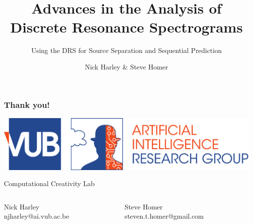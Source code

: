 \documentclass{beamer}
\begin{document}
\title{Advances in the Analysis of \\ Discrete Resonance Spectrograms}
\subtitle{Using the DRS for Source Separation and Sequential Prediction}
\author{Nick Harley \& Steve Homer}
\date{}
\frame{\titlepage}

%



\begin{frame}
  \frametitle{Thank you!}
  \includegraphics[width=\textwidth]{dept/vub-ai.pdf}
  \begin{center}
    \huge{Computational Creativity Lab}
    
    \begin{columns}
    	\begin{column}{0.5\textwidth}
    		\centering
    		\par \hfill \par
    		\small{Nick Harley \\
    		njharley@ai.vub.ac.be}
    	\end{column}
    	\begin{column}{0.5\textwidth}
    		\centering
    		\par \hfill \par
    		\small{Steve Homer \\
    		steven.t.homer@gmail.com}
    	\end{column}
    \end{columns}
    
  \end{center}
\end{frame}
\end{document}

